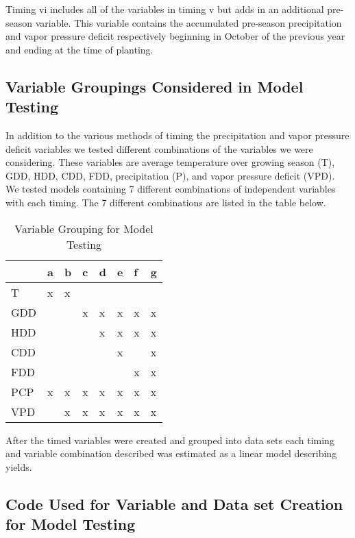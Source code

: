 Timing vi includes all of the variables in timing v but adds in an additional pre-season variable. This variable contains the accumulated pre-season precipitation and vapor pressure deficit respectively beginning in October of the previous year and ending at the time of planting. 

\subsection{Variable Groupings Considered in Model Testing}

In addition to the various methods of timing the precipitation and vapor pressure deficit variables we tested different combinations of the variables we were considering. These variables are average temperature over growing season (T), GDD, HDD, CDD, FDD, precipitation (P), and vapor pressure deficit (VPD). We tested models containing 7 different combinations of independent variables with each timing. The 7 different combinations are listed in the table below.

\begin{table}[!htbp]
\caption{Variable Grouping for Model Testing}
\label{var_groups_tab}
\begin{tabular}{l|lllllll}
\hline
                    & a & b & c & d & e & f & g \\
                    \hline
T                   & x & x &   &   &   &   &   \\
GDD                 &   &   & x & x & x & x & x \\
HDD                 &   &   &   & x & x & x & x \\
CDD                 &   &   &   &   & x &   & x \\
FDD                 &   &   &   &   &   & x & x \\
PCP                   & x & x & x & x & x & x & x \\
VPD                 &   & x & x & x & x & x & x\\
\hline
\end{tabular}
\end{table}

After the timed variables were created and grouped into data sets each timing and variable combination described was estimated as a linear model describing yields. 

\subsection{Code Used for Variable and Data set Creation for Model Testing}

